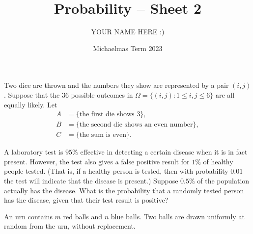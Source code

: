 \documentclass[answers]{exam}
\title{Probability -- Sheet 2}
\author{YOUR NAME HERE :)}
\date{Michaelmas Term 2023}
\begin{document}
\maketitle
\begin{questions}

\question%
Two dice are thrown and the numbers they show are represented by a pair $(i, j)$. Suppose that the 36 possible outcomes in $\Omega=\{(i, j): 1 \leq i, j \leq 6\}$ are all equally likely. Let \begin{align*}
	A&=\{\text{the first die shows } 3\}, \\
	B&=\{\text{the second die shows an even number}\}, \\
	C&=\{\text{the sum is even}\}.
\end{align*}



\question%
A laboratory test is $95\%$ effective in detecting a certain disease when it is in fact present. However, the test also gives a false positive result for $1\%$ of healthy people tested. (That is, if a healthy person is tested, then with probability 0.01 the test will indicate that the disease is present.) Suppose $0.5\%$ of the population actually has the disease. What is the probability that a randomly tested person has the disease, given that their test result is positive?



\question%
An urn contains $m$ red balls and $n$ blue balls. Two balls are drawn uniformly at random from the urn, without replacement.
\begin{parts}

\end{parts}
\end{questions}
\end{document}
